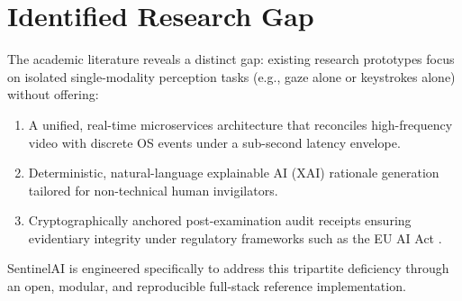 \begin{table}[htbp]
\centering
\small
\caption{Systematic comparison of automated proctoring systems and literature prototypes.}
\label{tab:lit_matrix}
\end{table}

\section{Identified Research Gap}

The academic literature reveals a distinct gap: existing research prototypes focus on isolated single-modality perception tasks (e.g., gaze alone or keystrokes alone) without offering:
\begin{enumerate}
    \item A unified, real-time microservices architecture that reconciles high-frequency video with discrete OS events under a sub-second latency envelope.
    \item Deterministic, natural-language explainable AI (XAI) rationale generation tailored for non-technical human invigilators.
    \item Cryptographically anchored post-examination audit receipts ensuring evidentiary integrity under regulatory frameworks such as the EU AI Act \cite{euaiact2024}.
\end{enumerate}

SentinelAI is engineered specifically to address this tripartite deficiency through an open, modular, and reproducible full-stack reference implementation.
